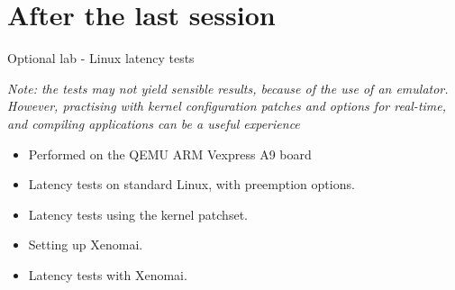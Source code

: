 \documentclass[a4paper,12pt,obeyspaces,spaces,hyphens]{article}
\begin{document}
\section{After the last session}

\feagendaonecolumn
{Optional lab - Linux latency tests}
{
  {\em Note: the tests may not yield sensible results, because
   of the use of an emulator. However, practising with kernel
   configuration patches and options for real-time, and compiling
   applications can be a useful experience}
  \begin{itemize}
  \item Performed on the QEMU ARM Vexpress A9 board
  \item Latency tests on standard Linux, with preemption options.
  \item Latency tests using the  kernel patchset.
  \item Setting up Xenomai.
  \item Latency tests with Xenomai.
  \end{itemize}
}
\end{document}
